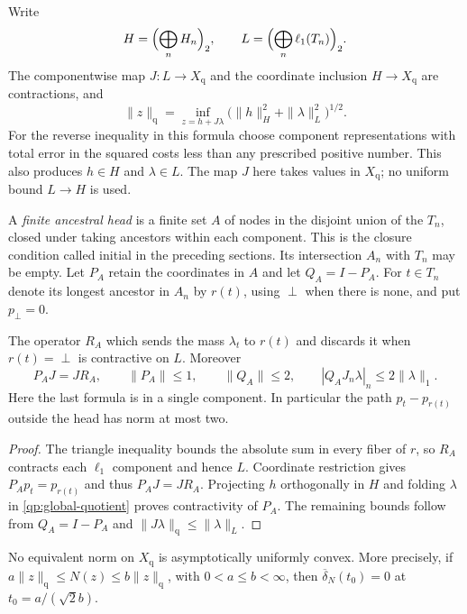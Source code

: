 Write
\[
 H=\Bigl(\bigoplus_n H_n\Bigr)_2,\qquad
 L=\Bigl(\bigoplus_n\ell_1(T_n)\Bigr)_2.
\]
The componentwise map $J:L\to X_{\mathrm q}$ and the coordinate
inclusion $H\to X_{\mathrm q}$ are contractions, and
\begin{equation}\label{qp:global-quotient}
 \|z\|_{\mathrm q}=
 \inf_{z=h+J\lambda}
       \bigl(\|h\|_H^2+\|\lambda\|_L^2\bigr)^{1/2}.
\end{equation}
For the reverse inequality in this formula choose component
representations with total error in the squared costs less than any
prescribed positive number.  This also produces $h\in H$ and
$\lambda\in L$.  The map $J$ here takes values in $X_{\mathrm q}$; no
uniform bound $L\to H$ is used.

A \emph{finite ancestral head} is a finite set $A$ of nodes in the
disjoint union of the $T_n$, closed under taking ancestors within each
component. This is the closure condition called initial in the preceding
sections. Its intersection $A_n$ with $T_n$ may be empty. Let
$P_A$ retain the coordinates in $A$ and let $Q_A=I-P_A$.  For
$t\in T_n$ denote its longest ancestor in $A_n$ by $r(t)$, using
$\perp$ when there is none, and put $p_\perp=0$.

\begin{lemma}\label{qp:head}
The operator $R_A$ which sends the mass $\lambda_t$ to $r(t)$ and
discards it when $r(t)=\perp$ is contractive on $L$.  Moreover
\[
 P_AJ=JR_A,\qquad \|P_A\|\le1,\qquad \|Q_A\|\le2,
 \qquad |Q_AJ_n\lambda|_n\le2\|\lambda\|_1.
\]
Here the last formula is in a single component.  In particular the
path $p_t-p_{r(t)}$ outside the head has norm at most two.
\end{lemma}

\begin{proof}
The triangle inequality bounds the absolute sum in every fiber of
$r$, so $R_A$ contracts each $\ell_1$ component and hence $L$.
Coordinate restriction gives $P_Ap_t=p_{r(t)}$ and thus $P_AJ=JR_A$.
Projecting $h$ orthogonally in $H$ and folding $\lambda$ in
\eqref{qp:global-quotient} proves contractivity of $P_A$.
The remaining bounds follow from $Q_A=I-P_A$ and
$\|J\lambda\|_{\mathrm q}\le\|\lambda\|_L$.
\end{proof}

\begin{proposition}\label{qp:no-auc}
No equivalent norm on $X_{\mathrm q}$ is asymptotically uniformly
convex.  More precisely, if
$a\|z\|_{\mathrm q}\le N(z)\le b\|z\|_{\mathrm q}$, with
$0<a\le b<\infty$, then
$\overline\delta_N(t_0)=0$ at $t_0=a/(\sqrt2 b)$.
\end{proposition}

